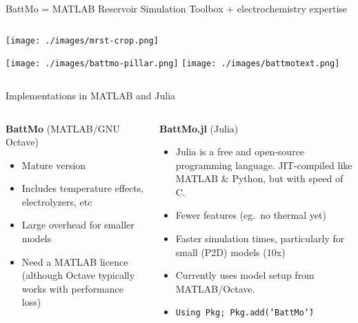 \documentclass{beamer}
\newcommand*{\ditto}{\texttt{\char`\"}}
\begin{document}
\begin{frame}{BattMo = MATLAB Reservoir Simulation Toolbox + electrochemistry expertise}
\begin{columns}
\begin{column}{0.4\linewidth}
      \texttt{[image: ./images/mrst-crop.png]}

       \vspace{0.5cm}

       \texttt{[image: ./images/battmo-pillar.png]}
      \texttt{[image: ./images/battmotext.png]}



    \end{column}
  \end{columns}

\end{frame}


\begin{frame}{Implementations in MATLAB and Julia}

  \begin{columns}[T]
    \begin{column}{0.55\textwidth}
      {\bf BattMo} (MATLAB/GNU Octave)
      \begin{itemize}
      \item Mature version
      \item Includes temperature effects, electrolyzers, etc
      \item Large overhead for smaller models
      \item Need a MATLAB licence (although Octave typically works with performance loss)
      \end{itemize}
    \end{column}
    \begin{column}{0.55\textwidth}
      {\bf BattMo.jl} (Julia)
      \begin{itemize}
      \item Julia is a free and open-source programming language. JIT-compiled like MATLAB \& Python, but with speed of C.
      \item Fewer features (eg.\ no thermal yet)
      \item Faster simulation times, particularly for small (P2D) models (10x)
      \item Currently uses model setup from MATLAB/Octave.
      \item \texttt{Using Pkg; Pkg.add(\ditto BattMo\ditto)}
      \end{itemize}
    \end{column}
  \end{columns}

\end{frame}
\end{document}
